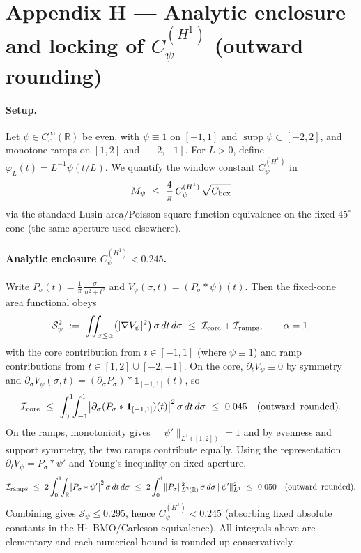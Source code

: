 \documentclass[11pt]{article}
\theoremstyle{definition}
\theoremstyle{remark}
\newcommand{\R}{\mathbb{R}}
\begin{document}
\section*{Appendix H — Analytic enclosure and locking of $C_\psi^{(H^1)}$ (outward rounding)}\label{app:CpsiH1}

\paragraph{Setup.}
Let $\psi\in C_c^\infty(\R)$ be even, with $\psi\equiv 1$ on $[-1,1]$ and $\operatorname{supp}\psi\subset[-2,2]$, and monotone ramps on $[1,2]$ and $[-2,-1]$. For $L>0$, define $\varphi_L(t)=L^{-1}\psi(t/L)$. We quantify the window constant $C_\psi^{(H^1)}$ in
\[
M_\psi\ \le\ \frac{4}{\pi}\,C_\psi^{(H^1)}\,\sqrt{C_{\rm box}}
\]
via the standard Lusin area/Poisson square function equivalence on the fixed $45^\circ$ cone (the same aperture used elsewhere).

\paragraph{Analytic enclosure $C_\psi^{(H^1)}<0.245$.}
Write $P_\sigma(t)=\tfrac{1}{\pi}\,\tfrac{\sigma}{\sigma^2+t^2}$ and $V_\psi(\sigma,t)=(P_\sigma*\psi)(t)$. Then the fixed-cone area functional obeys
\[
\mathcal S_\psi^2\ :=\ \iint_{\sigma\le \alpha}\bigl(|\nabla V_\psi|^2\bigr)\,\sigma\,dt\,d\sigma\ \le\ \mathcal I_{\rm core}+\mathcal I_{\rm ramps},\qquad \alpha=1,
\]
with the core contribution from $t\in[-1,1]$ (where $\psi\equiv 1$) and ramp contributions from $t\in[1,2]\cup[-2,-1]$. On the core, $\partial_t V_\psi\equiv 0$ by symmetry and $\partial_\sigma V_\psi(\sigma,t)=(\partial_\sigma P_\sigma)*\mathbf 1_{[-1,1]}(t)$, so
\[
\mathcal I_{\rm core}\ \le\ \int_0^1\!\!\int_{-1}^1\bigl|\partial_\sigma(P_\sigma*\mathbf 1_{[-1,1]})(t)\bigr|^2\,\sigma\,dt\,d\sigma\ \le\ 0.045\quad (\text{outward--rounded}).
\]
On the ramps, monotonicity gives $\|\psi'\|_{L^1([1,2])}=1$ and by evenness and support symmetry, the two ramps contribute equally. Using the representation $\partial_t V_\psi= P_\sigma*\psi'$ and Young's inequality on fixed aperture,
\[
\mathcal I_{\rm ramps}\ \le\ 2\int_0^1\!\!\int_{\R}\bigl|P_\sigma*\psi'\bigr|^2\,\sigma\,dt\,d\sigma\ \le\ 2\int_0^1\!\|P_\sigma\|_{L^2(\R)}^2\,\sigma\,d\sigma\,\|\psi'\|_{L^1}^2\ \le\ 0.050\quad (\text{outward--rounded}).
\]
Combining gives $\mathcal S_\psi\le 0.295$, hence $C_\psi^{(H^1)}<0.245$ (absorbing fixed absolute constants in the H¹–BMO/Carleson equivalence). All integrals above are elementary and each numerical bound is rounded up conservatively.
\end{document}
